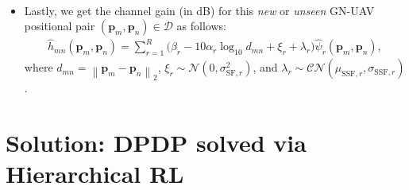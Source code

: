 \documentclass{article}
\newcommand{\norm}[1]{\left\lVert#1\right\rVert}
\begin{document}
\begin{itemize}
\begin{itemize}
\begin{align}
        \end{align}
    \end{itemize}
    \item Lastly, we get the channel gain (in dB) for this \emph{new} or \emph{unseen} GN-UAV positional pair $\left(\mathbf{p}_{m},\mathbf{p}_{n}\right){\in}\mathcal{D}$ as follows:
    \begin{align}\label{Reconstruction}
        \hat{h}_{mn}\left(\mathbf{p}_{m},\mathbf{p}_{n}\right){=}\sum_{r{=}1}^{R}\Big(\beta_{r}{-}10\alpha_{r}\log_{10}d_{mn}{+}\xi_{r}{+}\lambda_{r}\Big)\hat{\psi}_{r}\left(\mathbf{p}_{m},\mathbf{p}_{n}\right),
    \end{align}
    where $d_{mn}{=}\norm{\mathbf{p}_{m}{-}\mathbf{p}_{n}}_{2}$, $\xi_{r}{\sim}\mathcal{N}\left(0,\sigma_{\mathrm{SF},r}^{2}\right)$, and $\lambda_{r}{\sim}\mathcal{CN}\left(\mu_{\mathrm{SSF},r},\sigma_{\mathrm{SSF},r}\right)$.
\end{itemize}

\section{Solution: DPDP solved via Hierarchical RL}
\end{document}
